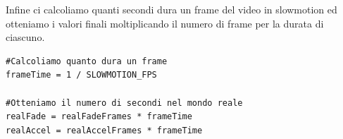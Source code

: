 \documentclass[main.tex]{subfiles}
\begin{document}
Infine ci calcoliamo quanti secondi dura un frame del video in slowmotion ed otteniamo i valori finali moltiplicando il numero di frame per la durata di ciascuno.
\begin{lstlisting}
#Calcoliamo quanto dura un frame
frameTime = 1 / SLOWMOTION_FPS

#Otteniamo il numero di secondi nel mondo reale
realFade = realFadeFrames * frameTime
realAccel = realAccelFrames * frameTime
\end{lstlisting}
\end{document}
